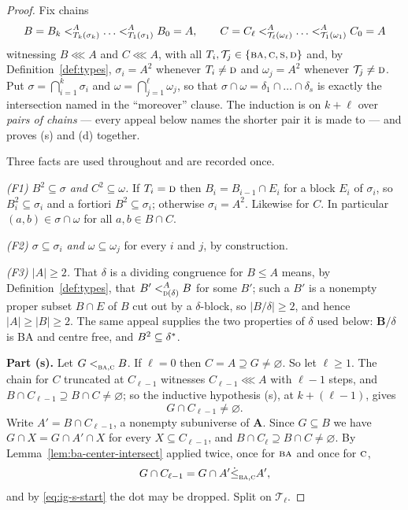 \begin{proof}
Fix chains
\[
  B=B_{k}\subt[A]{T_{k}(\sigma_{k})}\dots\subt[A]{T_{1}(\sigma_{1})}B_{0}=A,
  \qquad
  C=C_{\ell}\subt[A]{\mathcal T_{\ell}(\omega_{\ell})}\dots
  \subt[A]{\mathcal T_{1}(\omega_{1})}C_{0}=A
\]
witnessing $B\lll A$ and $C\lll A$, with all $T_{i},\mathcal T_{j}\in
\{\TBA,\TC,\TS,\TD\}$ and, by Definition~\ref{def:types}, $\sigma_{i}=A^{2}$
whenever $T_{i}\neq\TD$ and $\omega_{j}=A^{2}$ whenever
$\mathcal T_{j}\neq\TD$. Put $\sigma=\bigcap_{i=1}^{k}\sigma_{i}$ and
$\omega=\bigcap_{j=1}^{\ell}\omega_{j}$, so that
$\sigma\cap\omega=\delta_{1}\cap\dots\cap\delta_{s}$ is exactly the
intersection named in the ``moreover'' clause. The induction is on $k+\ell$
over \emph{pairs of chains} --- every appeal below names the shorter pair it is
made to --- and proves (s) and (d) together.

Three facts are used throughout and are recorded once.

\emph{(F1) $B^{2}\subseteq\sigma$ and $C^{2}\subseteq\omega$.} If $T_{i}=\TD$
then $B_{i}=B_{i-1}\cap E_{i}$ for a block $E_{i}$ of $\sigma_{i}$, so
$B_{i}^{2}\subseteq\sigma_{i}$ and a fortiori $B^{2}\subseteq\sigma_{i}$;
otherwise $\sigma_{i}=A^{2}$. Likewise for $C$. In particular
$(a,b)\in\sigma\cap\omega$ for all $a,b\in B\cap C$.

\emph{(F2) $\sigma\subseteq\sigma_{i}$ and $\omega\subseteq\omega_{j}$} for
every $i$ and $j$, by construction.

\emph{(F3) $|A|\ge2$.} That $\delta$ is a dividing congruence for $B\le A$
means, by Definition~\ref{def:types}, that $B'\subt[A]{\TD(\delta)}B$ for some
$B'$; such a $B'$ is a nonempty proper subset $B\cap E$ of $B$ cut out by a
$\delta$-block, so $|B/\delta|\ge2$, and hence $|A|\ge|B|\ge2$. The same
appeal supplies the two properties of $\delta$ used below: $\mathbf B/\delta$
is BA and centre free, and $B^{2}\subseteq\cover{\delta}$.

\medskip\noindent\textbf{Part (s).} Let $G\subt{\TBA,\TC}B$. If $\ell=0$ then
$C=A\supseteq G\neq\varnothing$. So let $\ell\ge1$. The chain for $C$
truncated at $C_{\ell-1}$ witnesses $C_{\ell-1}\lll A$ with $\ell-1$ steps, and
$B\cap C_{\ell-1}\supseteq B\cap C\neq\varnothing$; so the inductive hypothesis
(s), at $k+(\ell-1)$, gives
\begin{equation}\label{eq:ig-s-start}
  G\cap C_{\ell-1}\neq\varnothing .
\end{equation}
Write $A'=B\cap C_{\ell-1}$, a nonempty subuniverse of $\mathbf A$. Since
$G\subseteq B$ we have $G\cap X=G\cap A'\cap X$ for every $X\subseteq
C_{\ell-1}$, and $B\cap C_{\ell}\supseteq B\cap C\neq\varnothing$. By
Lemma~\ref{lem:ba-center-intersect} applied twice, once for $\TBA$ and once for
$\TC$,
\begin{equation}\label{eq:ig-s-cut}
  G\cap C_{\ell-1}=G\cap A'\dsubte{\TBA,\TC}A',
\end{equation}
and by \eqref{eq:ig-s-start} the dot may be dropped. Split on
$\mathcal T_{\ell}$.


\end{proof}
